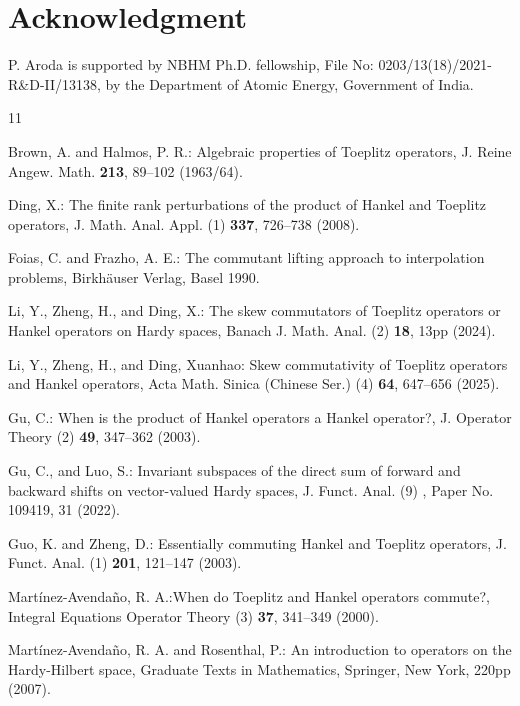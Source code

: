 \documentclass[12pt, reqno]{amsart}
\theoremstyle{definition}
\theoremstyle{remark}
\numberwithin{equation}{section}
\begin{document}
\section*{{{Acknowledgment}}}
P. Aroda is supported by NBHM Ph.D. fellowship, File No: 0203/13(18)/2021-R\&D-II/13138, by the Department of Atomic Energy, Government of India.
       
    \begin{thebibliography}{11}


		Brown, A. and Halmos, P. R.: {Algebraic properties of {T}oeplitz operators}, J. Reine Angew. Math. {\bf 213}, 89--102 (1963/64).


        Ding, X.: {The finite rank perturbations of the product of {H}ankel and {T}oeplitz operators}, J. Math. Anal. Appl. (1) {\bf 337}, 726--738 (2008).

        Foias, C. and Frazho, A. E.: {The commutant lifting approach to interpolation problems}, Birkh\"auser Verlag, Basel 1990.

        Li, Y., Zheng, H., and Ding, X.: {The skew commutators of {T}oeplitz operators or {H}ankel operators on {H}ardy spaces}, Banach J. Math. Anal. (2) {\bf 18}, 13pp (2024).

        Li, Y., Zheng, H., and Ding, Xuanhao: {Skew commutativity of {T}oeplitz operators and {H}ankel operators}, Acta Math. Sinica (Chinese Ser.) (4) {\bf 64}, 647--656 (2025).


        Gu, C.: {When is the product of {H}ankel operators a {H}ankel operator?}, J. Operator Theory (2) {\bf 49},
        347--362 (2003).

        Gu, C., and Luo, S.: {Invariant subspaces of the direct sum of forward and backward
              shifts on vector-valued {H}ardy spaces}, J. Funct. Anal. (9) {\bf }, Paper No. 109419, 31 (2022).

        Guo, K. and Zheng, D.: {Essentially commuting {H}ankel and {T}oeplitz operators}, J. Funct. Anal. (1) {\bf 201}, 121--147 (2003).

        Mart\'inez-Avenda\~no, R. A.:{When do {T}oeplitz and {H}ankel operators commute?}, Integral Equations Operator Theory (3) {\bf 37}, 341--349 (2000).


        Mart\'inez-Avenda\~no, R. A. and Rosenthal, P.: {An introduction to operators on the {H}ardy-{H}ilbert space}, Graduate Texts in Mathematics, Springer, New York, 220pp (2007).


\end{thebibliography}
\end{document}
